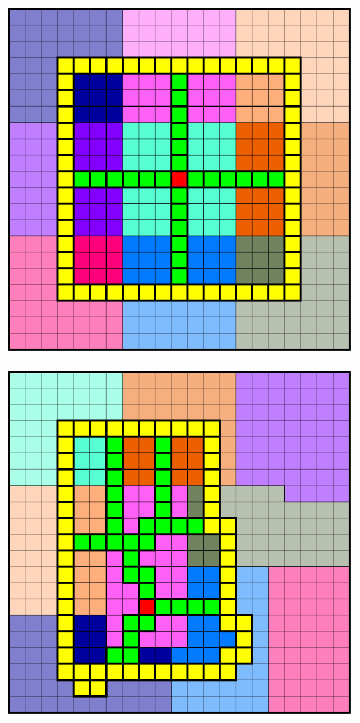 \begin{figure}[htbp]
  \begin{subfigure}[t]{0.3\textwidth}
    \centerline{\includegraphics[width=0.9\linewidth]{figs/square/square_cart_struct_cell_supp}}
  \end{subfigure}
  \hfill
  \begin{subfigure}[t]{0.3\textwidth}
    \centerline{\includegraphics[width=0.9\linewidth]{figs/square/square_cart_metis_cell_supp}}

\end{subfigure}
\end{figure}
